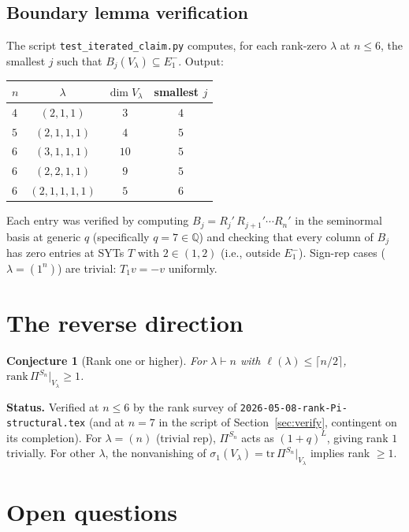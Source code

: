 \documentclass[11pt]{article}
\newtheorem{conjecture}[theorem]{Conjecture}
\theoremstyle{definition}
\begin{document}
\subsection{Boundary lemma verification}

The script \texttt{test\_iterated\_claim.py} computes, for each
rank-zero $\lambda$ at $n\le 6$, the smallest $j$ such that
$B_j(V_\lambda)\subseteq E_1^-$. Output:
\begin{center}
\begin{tabular}{l c c c}
\toprule
$n$ & $\lambda$ & $\dim V_\lambda$ & smallest $j$ \\
\midrule
$4$ & $(2,1,1)$       & $3$  & $4$ \\
$5$ & $(2,1,1,1)$     & $4$  & $5$ \\
$6$ & $(3,1,1,1)$     & $10$ & $5$ \\
$6$ & $(2,2,1,1)$     & $9$  & $5$ \\
$6$ & $(2,1,1,1,1)$   & $5$  & $6$ \\
\bottomrule
\end{tabular}
\end{center}
Each entry was verified by computing
$B_j = R_j'\,R_{j+1}'\cdots R_n'$ in the seminormal basis at
generic $q$ (specifically $q=7\in\mathbb{Q}$) and checking that
every column of $B_j$ has zero entries at SYTs $T$ with
$2\in(1,2)$ (i.e., outside $E_1^-$). Sign-rep cases
($\lambda=(1^n)$) are trivial: $T_1 v=-v$ uniformly.

\section{The reverse direction}\label{sec:reverse}

\begin{conjecture}[Rank one or higher]\label{conj:reverse}
For $\lambda\vdash n$ with $\ell(\lambda)\le \lceil n/2\rceil$,
$\mathrm{rank}\,\Pi^{S_n}|_{V_\lambda} \ge 1$.
\end{conjecture}

\noindent\textbf{Status.} Verified at $n\le 6$ by the rank
survey of \texttt{2026-05-08-rank-Pi-structural.tex} (and at $n=7$
in the script of Section~\ref{sec:verify}, contingent on its
completion). For $\lambda=(n)$ (trivial rep), $\Pi^{S_n}$ acts as
$(1+q)^L$, giving rank $1$ trivially. For other $\lambda$, the
nonvanishing of $\sigma_1(V_\lambda)=\mathrm{tr}\,\Pi^{S_n}|_{V_\lambda}$
implies rank $\ge 1$.

\section{Open questions}\label{sec:open}
\end{document}
